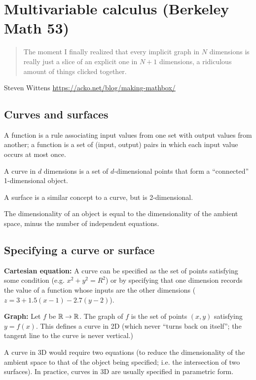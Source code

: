 \section{Multivariable calculus (Berkeley Math 53)}

\begin{quote}
  The moment I finally realized that every implicit graph in $N$ dimensions is really just a slice of
  an explicit one in $N+1$ dimensions, a ridiculous amount of things clicked together.
\end{quote}
Steven Wittens \url{https://acko.net/blog/making-mathbox/}

\subsection{Curves and surfaces}

A function is a rule associating input values from one set with output values
from another; a function is a set of (input, output) pairs in which each input
value occurs at most once.

A curve in $d$ dimensions is a set of $d$-dimensional points that form a
``connected'' 1-dimensional object.

A surface is a similar concept to a curve, but is 2-dimensional.

The dimensionality of an object is equal to the dimensionality of the ambient
space, minus the number of independent equations.

\subsection{Specifying a curve or surface}

\textbf{Cartesian equation:} A curve can be specified as the set of points
satisfying some condition (e.g. $x^2 + y^2 = R^2$) or by specifying that one
dimension records the value of a function whose inputs are the other
dimensions ($z = 3 + 1.5(x-1) - 2.7(y-2)$).

\textbf{Graph:} Let $f$ be $\mathbb{R} \to \mathbb{R}$. The graph of $f$ is the set of points
$(x,y)$ satisfying $y = f(x)$. This defines a curve in 2D (which never ``turns
back on itself''; the tangent line to the curve is never vertical.)

A curve in 3D would require two equations (to reduce the dimensionality of the
ambient space to that of the object being specified; i.e. the intersection of
two surfaces). In practice, curves in 3D are usually specified in parametric
form.

